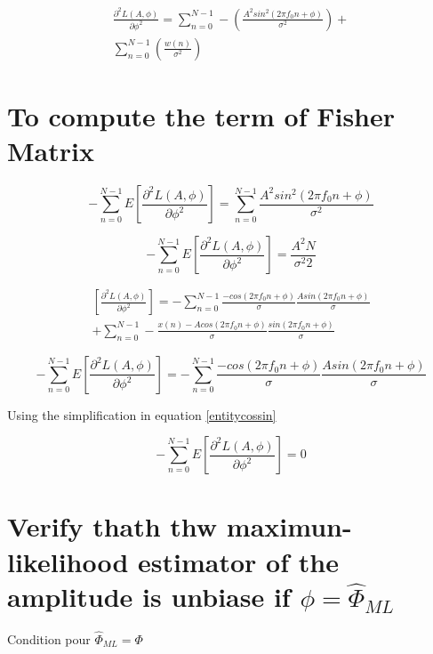 \documentclass{report}
\begin{document}
\begin{gather*}\label{key}
\frac{\partial^2 L(A,\phi)}{\partial \phi^2} = \sum_{n=0}^{N-1} - (\frac{A^2sin^2(2\pi f_0 n +\phi)}{\sigma^2})+\\
\sum_{n=0}^{N-1} (\frac{w(n)}{\sigma^2})
\end{gather*}

\section{To compute the term of Fisher Matrix}

\begin{equation}\label{key}
-\sum_{n=0}^{N-1} E[\frac{\partial^2 L(A,\phi)}{\partial \phi^2}] = \sum_{n=0}^{N-1}\frac{A^2sin^2(2\pi f_0 n +\phi)}{\sigma^2}
\end{equation}


\begin{equation}\label{key}
-\sum_{n=0}^{N-1} E[\frac{\partial^2 L(A,\phi)}{\partial \phi^2}] = \frac{A^2N}{\sigma^2 2}
\end{equation} 


\begin{gather*}\label{key}
[\frac{\partial^2 L(A,\phi)}{\partial \phi^2}] = -\sum_{n=0}^{N-1} \frac{- cos(2\pi f_0 n +\phi)}{\sigma} \frac{Asin(2\pi f_0 n +\phi)}{\sigma} \\  + \sum_{n=0}^{N-1} - \frac{x(n)- Acos(2\pi f_0 n +\phi)}{\sigma} \frac{sin(2\pi f_0 n +\phi)}{\sigma}
\end{gather*}

\begin{equation}\label{key}
-\sum_{n=0}^{N-1} E[\frac{\partial^2 L(A,\phi)}{\partial \phi^2}] = -\sum_{n=0}^{N-1} \frac{- cos(2\pi f_0 n +\phi)}{\sigma} \frac{Asin(2\pi f_0 n +\phi)}{\sigma}
\end{equation} 

Using the simplification in equation \ref{entitycossin}

\begin{equation}\label{key}
-\sum_{n=0}^{N-1} E[\frac{\partial^2 L(A,\phi)}{\partial \phi^2}] = 0
\end{equation} 

\section{Verify thath thw maximun-likelihood estimator of the amplitude is unbiase if $\phi = \hat{\Phi}_{ML}$}

Condition pour $\hat{\Phi}_{ML} = \Phi$
\end{document}
